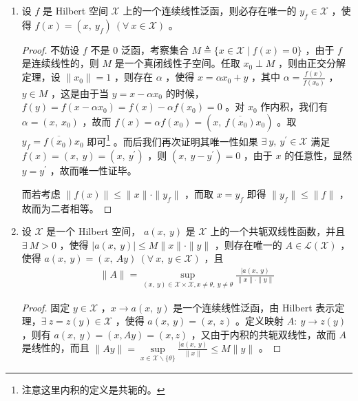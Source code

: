 	\begin{enumerate}[leftmargin=2cm, label=\arabic*]
		\item 设 $f$ 是 Hilbert 空间 $\mathscr{X}$ 上的一个连续线性泛函，则必存在唯一的 $y_f\in\mathscr{X}$ ，使得 $f(x) = (x,\ y_f)\ (\forall\ x\in\mathscr{X})$ 。
		\begin{proof}
			不妨设 $f$ 不是 $0$ 泛函，考察集合 $M\triangleq\{x\in\mathscr{X}\mid f(x) = 0\}$ ，由于 $f$ 是连续线性的，则 $M$ 是一个真闭线性子空间。任取 $x_0\perp M$ ，则由正交分解定理，设 $\|x_0\|= 1 $ ，则存在 $\alpha$ ，使得 $x = \alpha x_0 + y $ ，其中 $\alpha = \frac{f(x)}{f(x_0)}$ ，$y\in M$ ，这是由于当 $y=x-\alpha x_0$ 的时候，$f(y) = f(x-\alpha x_0) = f(x) - \alpha f(x_0) = 0$ 。对 $x_0$ 作内积，我们有 $\alpha = (x,\ x_0)$ ，故而 $f(x) = \alpha f(x_0) = (x,\ \overline{f(x_0)}x_0)$ 。取 $y_f = \overline{f(x_0)}x_0$ 即可\footnote{注意这里内积的定义是共轭的。} 。而后我们再次证明其唯一性如果 $\exists\ y,\ y^{\prime}\in \mathscr{X}$ 满足 $f(x) = (x,\ y) = (x,\ y^{\prime})$ ，则 $(x,\ y-y^{\prime}) = 0$ ，由于 $x$ 的任意性，显然 $y = y^{\prime}$ ，故而唯一性证毕。
			
			而若考虑 $\|f(x)\|\leqslant\|x\|\cdot \|y_f\|$ ，而取 $x = y_f$ 即得 $\|y_f\|\leqslant\|f\|$ ，故而为二者相等。
		\end{proof}
		\item 设 $\mathscr{X}$ 是一个 Hilbert 空间， $a(x,\ y)$ 是 $\mathscr{X}$ 上的一个共轭双线性函数，并且 $\exists\ M>0$ ，使得 $|a(x,\ y)|\leqslant M\|x\|\cdot\|y\|$ ，则存在唯一的 $A\in\mathscr{L}(\mathscr{X})$ ，使得 $a(x,\ y)= (x,\ Ay)\ (\forall\ x,\ y\in \mathscr{X})$ ，且
		\begin{align*}
			\|A\| = \sup\limits_{(x,\ y)\in\mathscr{X}\times\mathscr{X}, x\neq\theta,\ y\neq\theta} \frac{|a(x,\ y)}{\|x\|\cdot\|y\|}
		\end{align*}
		\begin{proof}
			固定 $y\in\mathscr{X}$ ，$x\to a(x,\ y)$ 是一个连续线性泛函，由 Hilbert 表示定理，$\exists\ z=z(y)\in\mathscr{X}$ ，使得 $a(x,\ y) = (x,\ z)$ 。定义映射 $A:\ y\to z(y)$ ，则有 $a(x,\ y) = (x, Ay) = (x, z)$ ，又由于内积的共轭双线性，故而 $A$ 是线性的，而且 $\|Ay\| = \sup\limits_{x\in\mathscr{X}\backslash\{\theta\}}\frac{|a(x,\ y)}{\|x\|}\leqslant M\|y\|$ 。 
		\end{proof}
	\end{enumerate} 
	
	
